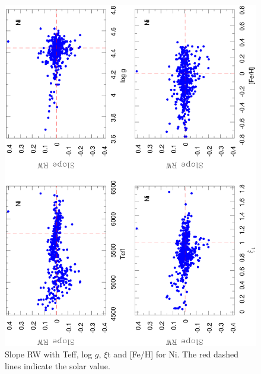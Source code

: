 \documentclass[dvips,12pt,a4paper]{report}
\begin{document}
{{\begin{figure}[h!]
\centering
\includegraphics[width=9.5 cm, angle=-90]{pics/parte3/RW.eps}
\caption[Slope RW with the stellar parameters for Ni]{Slope RW with Teff, log $g$, $\xi$t and [Fe/H] for Ni. The red dashed lines indicate the solar value.}
\label{slopeRW}
\end{figure}



}}
\end{document}
